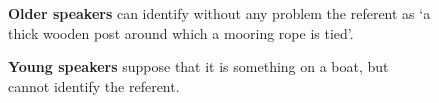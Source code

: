 \begin{subfigure}[t]{0.4\textwidth}
		{\centering
		}
		
		\caption{\textbf{Older speakers} can identify without any problem the referent as `a thick wooden post around which a mooring rope is tied'.}
	\end{subfigure}
\begin{subfigure}[t]{0.4\textwidth}
		{\centering
		}
		
		\caption{\textbf{Young speakers} suppose that it is something on a boat, but cannot identify the referent.}
	\end{subfigure}


% 